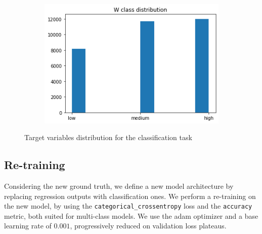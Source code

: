 \begin{figure}[!h]
\begin{center}
\begin{subfigure}[h]{0.24\textwidth}
		\end{subfigure}
		\hfill
		\begin{subfigure}[h]{0.24\textwidth}
			\centering
			\includegraphics[width=1\textwidth]{"contents/images/distributions/w-class"}
		\end{subfigure}
	\end{center}
	\vspace{-0.5cm}
	\caption[Target variables distribution for the classification task]{Target variables distribution for the classification task}
	\label{fig:frontalnet-dataset-distribution-class}
\end{figure}



\subsection{Re-training}
\label{subsec:gradcam-retrain}

Considering the new ground truth, we define a new model architecture by replacing regression outputs with classification ones. 
We perform a re-training on the new model, by using the \texttt{categorical\_crossentropy} loss and the \texttt{accuracy} metric, both suited for multi-class models. We use the \gls{adam} optimizer and a base learning rate of $0.001$, progressively reduced on validation loss plateaus. 

